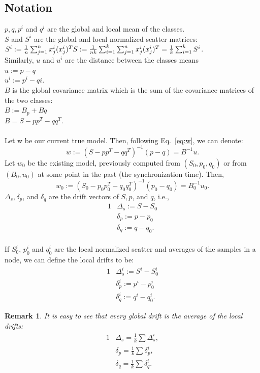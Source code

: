 \documentclass{sig-alternate-05-2015}
\newtheorem{remark}{Remark}
\begin{document}
\subsection{Notation}
$p,q,p^i$ and $q^i$  are the global and local mean of the classes.
\\$S$ and $S^i$  are the global and local normalized scatter matrices:
\\$S^i := \frac{1}{n}\sum_{j=1}^{n}x^i_j(x^i_j)^T
\\S := \frac{1}{nk}
\sum_{i=1}^k\sum_{j=1}^nx^i_j(x^i_j)^T=\frac{1}{k}\sum_{i=1}^kS^i$.
\\Similarly, $u$ and $u^i$ are the distance between the classes means
\\$u:=p - q$
\\$u^i:=p^i - qi$.
\\ $B$ is the global covariance matrix which is the sum of the covariance
matrices of the two classes:
\\$B:=B_p+Bq$
\\$B=S - pp^T - qq^T$.
\\\\Let w be our current true model. Then, following Eq.~\ref{eq:w}, we can
denote:
\begin{equation*}
w:=(S - pp^T - qq^T)^{-1}(p-q)=B^{-1}u.
\end{equation*}
Let $w_0$ be the existing model, previously computed from $(S_0, p_0, q_0)$
or from $(B_0,u_0)$ at some point in the past (the synchronization time).
Then,
\begin{equation*} 
w_0:=(S_0 - p_0p_0^T - q_0q_0^T)^{-1}(p_0-q_0)=B_0^{-1}u_0.
\end{equation*}
$\Delta_s, \delta_p$, and $\delta_q$ are the drift vectors of $S, p$, and $q$,
i.e.,
\begin{alignat*}{1}
& \Delta_s:= S - S_0 \\
& \delta_p:= p - p_0 \\
& \delta_q := q - q_0.
\end{alignat*}
\\If $S_0^i$, $p_0^i$ and $q_0^i$ are the local normalized scatter and averages
of the samples in a node, we can define the local drifts to be:
\begin{alignat*}{1}
& \Delta_s^i:= S^i - S_0^i
\\ & \delta_p^i:= p^i - p_0^i
\\ & \delta_q^i:= q^i - q_0^i.
\end{alignat*}
\begin{remark} \label{average}
It is easy to see that every global drift is the average of the local drifts:
\begin{alignat*}{1}
& \Delta_s = \frac{1}{k} \sum \Delta_s^i, \\
& \delta_p = \frac{1}{k} \sum \delta_p^i, \\
& \delta_q = \frac{1}{k} \sum \delta_q^i.
\end{alignat*}

\end{remark}
\end{document}
